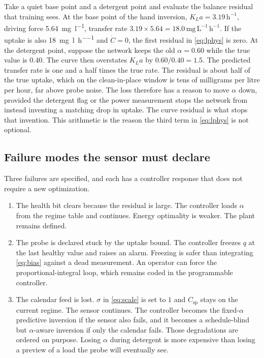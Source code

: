 Take a quiet base point and a detergent point and evaluate the balance residual that training sees. At the base point of the hand inversion, $K_La=3.19\,\mathrm{h^{-1}}$, driving force \SI{5.64}{\milli\gram\per\litre}, transfer rate $3.19\times 5.64=18.0\,\mathrm{mg\,L^{-1}\,h^{-1}}$. If the uptake is also \SI{18}{\milli\gram\per\litre\per\hour} and $\dot{C}=0$, the first residual in \eqref{eq:lphys} is zero. At the detergent point, suppose the network keeps the old $\alpha=0.60$ while the true value is $0.40$. The curve then overstates $K_La$ by $0.60/0.40=1.5$. The predicted transfer rate is one and a half times the true rate. The residual is about half of the true uptake, which on the clean-in-place window is tens of milligrams per litre per hour, far above probe noise. The loss therefore has a reason to move $\alpha$ down, provided the detergent flag or the power measurement stops the network from instead inventing a matching drop in uptake. The curve residual is what stops that invention. This arithmetic is the reason the third term in \eqref{eq:lphys} is not optional.

\subsection{Failure modes the sensor must declare}

Three failures are specified, and each has a controller response that does not require a new optimization.

\begin{enumerate}[leftmargin=1.6em,itemsep=0.45em]
\item The health bit clears because the residual is large. The controller loads $\alpha$ from the regime table and continues. Energy optimality is weaker. The plant remains defined.
\item The probe is declared stuck by the uptake bound. The controller freezes $q$ at the last healthy value and raises an alarm. Freezing is safer than integrating \eqref{eq:bias} against a dead measurement. An operator can force the proportional-integral loop, which remains coded in the programmable controller.
\item The calendar feed is lost. $\sigma$ in \eqref{eq:scale} is set to $1$ and $C_{\mathrm{sp}}$ stays on the current regime. The sensor continues. The controller becomes the fixed-$\alpha$ predictive inversion if the sensor also fails, and it becomes a schedule-blind but $\alpha$-aware inversion if only the calendar fails. Those degradations are ordered on purpose. Losing $\alpha$ during detergent is more expensive than losing a preview of a load the probe will eventually see.
\end{enumerate}

